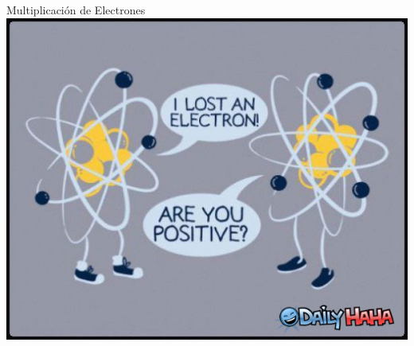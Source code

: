 \documentclass[a4paper,10pt]{beamer}
\begin{document}
\begin{frame}
\begin{center}
 \Huge{\color{blue}Multiplicación de Electrones} \\
 \vspace{0.5cm}
 \includegraphics[scale=0.3]{fig6}
\end{center}
\end{frame}
\end{document}
